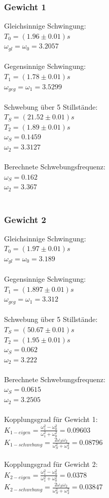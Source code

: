 \documentclass{article}
\begin{document}
\subsubsection{Gewicht 1}
Gleichsinnige Schwingung:\\
$T_0=(1.96 \pm 0.01)\si{s}$\\
$\omega_{gl}=\omega_0=3.2057$\\
\\
Gegensinnige Schwingung:\\
$T_1=(1.78 \pm 0.01)\si{s}$\\
$\omega_{geg}=\omega_1=3.5299$\\
\\
Schwebung über 5 Stillstände:\\
$T_S=(21.52 \pm 0.01)\si{s}$\\
$T_2=(1.89 \pm 0.01)\si{s}$\\
$\omega_S=0.1459$\\
$\omega_2=3.3127$\\
\\
Berechnete Schwebungsfrequenz:\\
$\omega_S=0.162$\\
$\omega_2=3.367$\\
\\
\subsubsection{Gewicht 2}
Gleichsinnige Schwingung:\\
$T_0=(1.97 \pm 0.01)\si{s}$\\
$\omega_{gl}=\omega_0=3.189$\\
\\
Gegensinnige Schwingung:\\
$T_1=(1.897 \pm 0.01)\si{s}$\\
$\omega_{geg}=\omega_1=3.312$\\
\\
Schwebung über 5 Stillstände:\\
$T_S=(50.67 \pm 0.01)\si{s}$\\
$T_2=(1.95 \pm 0.01)\si{s}$\\
$\omega_S=0.062$\\
$\omega_2=3.222$\\
\\
Berechnete Schwebungsfrequenz:\\
$\omega_S=0.0615$\\
$\omega_2=3.2505$\\
\\
Kopplungsgrad für Gewicht 1:\\
$K_{1-eigen}=\frac{\omega_1^2-\omega_0^2}{\omega_1^2+\omega_0^2}=0.09603$\\
$K_{1-schwebung}=\frac{2\omega_S \omega_2}{\omega_S^2 + \omega_2^2}=0.08796$\\
\\
Kopplungsgrad für Gewicht 2:\\
$K_{2-eigen}=\frac{\omega_1^2-\omega_0^2}{\omega_1^2+\omega_0^2}=0.0378$\\
$K_{2-schwebung}=\frac{2\omega_S \omega_2}{\omega_S^2 + \omega_2^2}=0.03847$\\
\end{document}
